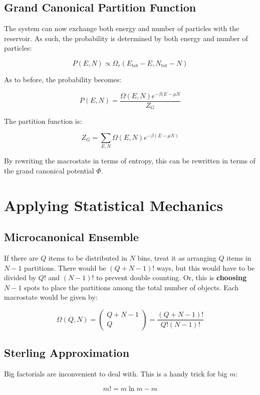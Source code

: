 \documentclass[12pt]{article}
\begin{document}
\subsection{Grand Canonical Partition Function}

The system can now exchange both energy and number of particles with the reservoir. As such, the probability is determined by both energy and number of particles:

\[P(E, N) \propto \Omega_r(E_\text{tot} - E, N_\text{tot} -N)\]

As to before, the probability becomes:

\[\boxed{P(E,N) = \frac{\Omega(E, N) e^{-\beta(E-\mu N}}{Z_G}}\]

The partition function is:

\[\boxed{Z_G = \sum_{E,N}\Omega(E,N)e^{-\beta(E-\mu N)}}\]

By rewriting the macrostate in terms of entropy, this can be rewritten in terms of the grand canonical potential $\Phi$.


\section{Applying Statistical Mechanics}

\subsection{Microcanonical Ensemble}

If there are $Q$ items to be distributed in $N$ bins, treat it as arranging $Q$ items in $N - 1$ partitions. There would be $(Q+N-1)!$ ways, but this would have to be divided by $Q!$ and $(N-1)!$ to prevent double counting. Or, this is \textbf{choosing} $N-1$ spots to place the partitions among the total number of objects. Each macrostate would be given by:

\[ \Omega(Q,N) = 
\left(
\begin{matrix}
Q+N-1\\
Q
\end{matrix}
\right)
=
\frac{(Q+N-1)!}{Q!(N-1)!}
\]

\subsection{Sterling Approximation}

Big factorials are inconvenient to deal with. This is a handy trick for big $m$:

\[ \boxed{ m! = m\ln{m} - m}\]
\end{document}
